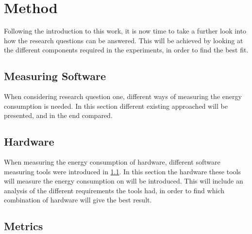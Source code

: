 \chapter{Method}\label{ch:method}

Following the introduction to this work, it is now time to take a further look into how the research questions can be answered. This will be achieved by looking at the different components required in the experiments, in order to find the best fit.

\section{Measuring Software}\label{sec:measuring_software}

When considering research question one, different ways of measuring the energy consumption is needed. In this section different existing approached will be presented, and in the end compared.







\section{Hardware}\label{sec:hardware}

When measuring the energy consumption of hardware, different software measuring tools were introduced in \cref{sec:measuring_software}. In this section the hardware these tools will measure the energy consumption on will be introduced. This will include an analysis of the different requirements the tools had, in order to find which combination of hardware will give the best result.

\section{Metrics}\label{sec:metrics}

